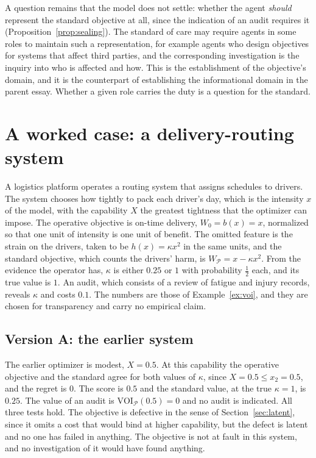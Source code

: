 \documentclass[11pt]{article}
\newcommand{\VOI}{\mathrm{VOI}}
\theoremstyle{plain}
\theoremstyle{definition}
\begin{document}
A question remains that the model does not settle: whether the agent \emph{should} represent the standard objective at all, since the indication of an audit requires it (Proposition~\ref{prop:sealing}). The standard of care may require agents in some roles to maintain such a representation, for example agents who design objectives for systems that affect third parties, and the corresponding investigation is the inquiry into who is affected and how. This is the establishment of the objective's domain, and it is the counterpart of establishing the informational domain in the parent essay. Whether a given role carries the duty is a question for the standard.

\section{A worked case: a delivery-routing system}\label{sec:worked}

A logistics platform operates a routing system that assigns schedules to drivers. The system chooses how tightly to pack each driver's day, which is the intensity $x$ of the model, with the capability $X$ the greatest tightness that the optimizer can impose. The operative objective is on-time delivery, $W_0=b(x)=x$, normalized so that one unit of intensity is one unit of benefit. The omitted feature is the strain on the drivers, taken to be $h(x)=\kappa x^2$ in the same units, and the standard objective, which counts the drivers' harm, is $W_{\mathcal P}=x-\kappa x^2$. From the evidence the operator has, $\kappa$ is either $0.25$ or $1$ with probability $\tfrac12$ each, and its true value is $1$. An audit, which consists of a review of fatigue and injury records, reveals $\kappa$ and costs $0.1$. The numbers are those of Example~\ref{ex:voi}, and they are chosen for transparency and carry no empirical claim.

\subsection*{Version A: the earlier system}

The earlier optimizer is modest, $X=0.5$. At this capability the operative objective and the standard agree for both values of $\kappa$, since $X=0.5\le x_2=0.5$, and the regret is $0$. The score is $0.5$ and the standard value, at the true $\kappa=1$, is $0.25$. The value of an audit is $\VOI_{\mathcal P}(0.5)=0$ and no audit is indicated. All three tests hold. The objective is defective in the sense of Section~\ref{sec:latent}, since it omits a cost that would bind at higher capability, but the defect is latent and no one has failed in anything. The objective is not at fault in this system, and no investigation of it would have found anything.
\end{document}
